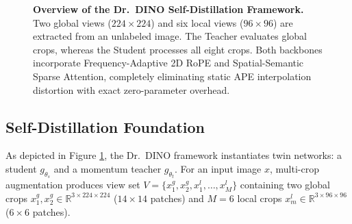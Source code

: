 \documentclass[11pt,a4paper]{article}
\begin{document}
\begin{figure}[t!]
{%
}
\caption{\textbf{Overview of the Dr.\ DINO Self-Distillation Framework.} Two global views ($224\times 224$) and six local views ($96\times 96$) are extracted from an unlabeled image. The Teacher evaluates global crops, whereas the Student processes all eight crops. Both backbones incorporate Frequency-Adaptive 2D RoPE and Spatial-Semantic Sparse Attention, completely eliminating static APE interpolation distortion with exact zero-parameter overhead.}
\label{fig:drdino_pipeline}
\end{figure}

\subsection{Self-Distillation Foundation}
\label{subsec:dino_foundation}

As depicted in Figure \ref{fig:drdino_pipeline}, the Dr.\ DINO framework instantiates twin networks: a student $g_{\theta_s}$ and a momentum teacher $g_{\theta_t}$. For an input image $x$, multi-crop augmentation produces view set $V = \{x_1^g, x_2^g, x_1^l, \dots, x_M^l\}$ containing two global crops $x_1^g, x_2^g \in \mathbb{R}^{3\times 224\times 224}$ ($14\times 14$ patches) and $M=6$ local crops $x_m^l \in \mathbb{R}^{3\times 96\times 96}$ ($6\times 6$ patches).
\end{document}
